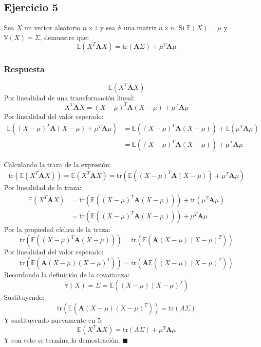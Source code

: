 \documentclass[11pt]{article}
\begin{document}
    \hypertarget{ejercicio-5}{%
\subsection{Ejercicio 5}\label{ejercicio-5}}

Sea \(X\) un vector aleatorio \(n\times1\) y sea \(\mathbb{A}\) una
matriz \(n\times n\). Si \(\mathbb{E}(X) = \mu\) y
\(\mathbb{V}(X) = \Sigma\), demuestre que:
\[\mathbb{E}(X^T\mathbf{A}X) = \mathrm{tr}(\mathbf{A}\Sigma)+\mu^T\mathbf{A}\mu\]

    \hypertarget{respuesta}{%
\subsubsection{Respuesta}\label{respuesta}}

\[\mathbb{E}(X^T\mathbf{A}X)\] Por linealidad de una transformación
lineal:
\[X^T\mathbf{A}X = \left(X-\mu\right)^T\mathbf{A}\left(X-\mu\right) + \mu^T\mathbf{A}\mu\]
Por linealidad del valor esperado: \[\begin{align*}
\mathbb{E}(\left(X-\mu\right)^T\mathbf{A}\left(X-\mu\right) + \mu^T\mathbf{A}\mu) &= \mathbb{E}(\left(X-\mu\right)^T\mathbf{A}\left(X-\mu\right))+ \mathbb{E}(\mu^T\mathbf{A}\mu) \\
&= \mathbb{E}(\left(X-\mu\right)^T\mathbf{A}\left(X-\mu\right)) + \mu^T\mathbf{A}\mu
\end{align*}\]

Calculando la traza de la expresión:
\[\mathrm{tr}(\mathbb{E}(X^T\mathbf{A}X)) = \mathbb{E}(X^T\mathbf{A}X) = \mathrm{tr}(\mathbb{E}(\left(X-\mu\right)^T\mathbf{A}\left(X-\mu\right)) + \mu^T\mathbf{A}\mu)\]
Por linealidad de la traza: \[\begin{align*}
\mathbb{E}(X^T\mathbf{A}X) &= \mathrm{tr}(\mathbb{E}(\left(X-\mu\right)^T\mathbf{A}\left(X-\mu\right))) + \mathrm{tr}(\mu^T\mathbf{A}\mu) \\
&= \mathrm{tr}(\mathbb{E}(\left(X-\mu\right)^T\mathbf{A}\left(X-\mu\right))) + \mu^T\mathbf{A}\mu\tag{5}
\end{align*}\] Por la propiedad cíclica de la traza:
\[\mathrm{tr}(\mathbb{E}(\left(X-\mu\right)^T\mathbf{A}\left(X-\mu\right))) = \mathrm{tr}(\mathbb{E}(\mathbf{A}\left(X-\mu\right)\left(X-\mu\right)^T))\]
Por linealidad del valor esperado:
\[\mathrm{tr}(\mathbb{E}(\mathbf{A}\left(X-\mu\right)\left(X-\mu\right)^T)) = \mathrm{tr}(\mathbf{A}\mathbb{E}(\left(X-\mu\right)\left(X-\mu\right)^T))\]
Recordando la definición de la covarianza:
\[\mathbb{V}(X) = \Sigma = \mathbb{E}(\left(X-\mu\right)\left(X-\mu\right)^T)\]
Sustituyendo:
\[\mathrm{tr}(\mathbb{E}(\mathbf{A}\left(X-\mu\right)\left(X-\mu\right)^T)) = \mathrm{tr}(A\Sigma)\]
Y sustituyendo nuevamente en \(5\):
\[\mathbb{E}(X^T\mathbf{A}X) = \mathrm{tr}(A\Sigma) + \mu^T\mathbf{A}\mu\]
Y con esto se termina la demostración. \(\blacksquare\)
\end{document}
